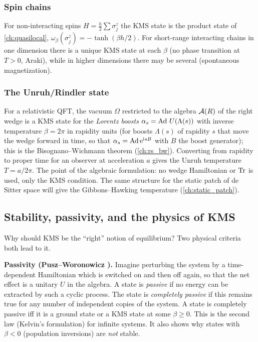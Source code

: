 \subsubsection{Spin chains}
For non-interacting spins $H=\frac h2\sum\sigma^z_j$ the KMS state is the product state of \cref{ch:quasilocal}, $\omega_\beta(\sigma^z_j)=-\tanh(\beta h/2)$. For short-range interacting chains in one dimension there is a unique KMS state at each $\beta$ (no phase transition at $T>0$, Araki), while in higher dimensions there may be several (spontaneous magnetization).

\subsubsection{The Unruh/Rindler state}
For a relativistic QFT, the vacuum $\Omega$ restricted to the algebra $\mathcal{A}(R)$ of the right wedge is a KMS state for the \emph{Lorentz boosts} $\alpha_s=\operatorname{Ad}\,U(\Lambda(s))$ with inverse temperature $\beta=2\pi$ in rapidity units (for boosts $\Lambda(s)$ of rapidity $s$ that move the wedge forward in time, so that $\alpha_s=\operatorname{Ad}\mathrm{e}^{\mathrm{i} sB}$ with $B$ the boost generator); this is the Bisognano--Wichmann theorem \cite{BisognanoWichmann1975,BisognanoWichmann1976} (\cref{ch:rs_bw}). Converting from rapidity to proper time for an observer at acceleration $a$ gives the Unruh temperature $T=a/2\pi$. The point of the algebraic formulation: no wedge Hamiltonian or $\operatorname{Tr}$ is used, only the KMS condition. The same structure for the static patch of de Sitter space will give the Gibbons--Hawking temperature (\cref{ch:static_patch}).

\subsection{Stability, passivity, and the physics of KMS}

Why should KMS be the ``right'' notion of equilibrium? Two physical criteria both lead to it.

\textbf{Passivity (Pusz--Woronowicz \cite{PuszWoronowicz1978}).} Imagine perturbing the system by a time-dependent Hamiltonian which is switched on and then off again, so that the net effect is a unitary $U$ in the algebra. A state is \emph{passive} if no energy can be extracted by such a cyclic process. The state is \emph{completely passive} if this remains true for any number of independent copies of the system. A state is completely passive iff it is a ground state or a KMS state at some $\beta\ge0$. This is the second law (Kelvin's formulation) for infinite systems. It also shows why states with $\beta<0$ (population inversions) are \emph{not} stable.

